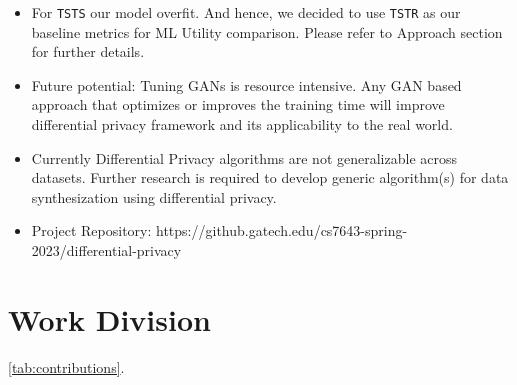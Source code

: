 \documentclass[10pt,twocolumn,letterpaper]{article}
\begin{document}
\begin{itemize}
    \item
    For \verb'TSTS' our model overfit. And hence, we decided to use \verb'TSTR' as our baseline metrics for ML Utility comparison. Please refer to Approach section for further details.

    \item Future potential: Tuning GANs is resource intensive. Any GAN based approach that optimizes or improves the training time will improve differential privacy framework and its applicability to the real world.
    \item Currently Differential Privacy algorithms are not generalizable across datasets. Further research is required to develop generic algorithm(s) for data synthesization using differential privacy.

    \item Project Repository: https://github.gatech.edu/cs7643-spring-2023/differential-privacy
\end{itemize}

\section{Work Division}
 \ref{tab:contributions}.

\newpage
\newpage

% 
% 
\end{document}
